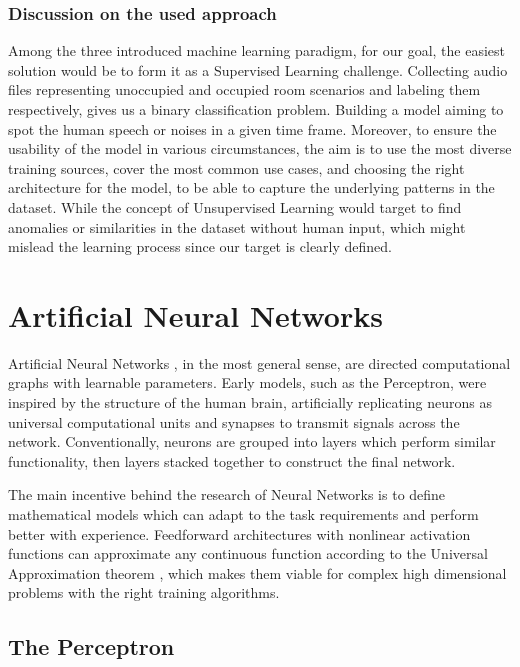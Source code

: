 
\subsubsection*{Discussion on the used approach}
Among the three introduced machine learning paradigm, for our goal, the easiest solution would be to form it as a Supervised Learning challenge. Collecting audio files representing unoccupied and occupied room scenarios and labeling them respectively, gives us a binary classification problem. Building a model aiming to spot the human speech or noises in a given time frame. Moreover, to ensure the usability of the model in various circumstances, the aim is to use the most diverse training sources, cover the most common use cases, and choosing the right architecture for the model, to be able to capture the underlying patterns in the dataset. While the concept of Unsupervised Learning would target to find anomalies or similarities in the dataset without human input, which might mislead the learning process since our target is clearly defined.


\section{Artificial Neural Networks}

Artificial Neural Networks \cite{DL_book_Goodfellow}, in the most general sense, are directed computational graphs with learnable parameters. Early models, such as the Perceptron, were inspired by the structure of the human brain, artificially replicating neurons as universal computational units and synapses to transmit signals across the network. Conventionally, neurons are grouped into layers which perform similar functionality, then layers stacked together to construct the final network.

The main incentive behind the research of Neural Networks is to define mathematical models which can adapt to the task requirements and perform better with experience. Feedforward architectures with nonlinear activation functions can approximate any continuous function according to the Universal Approximation theorem \cite{HORNIK1991univ}, which makes them viable for complex high dimensional problems with the right training algorithms.

\subsection{The Perceptron}

